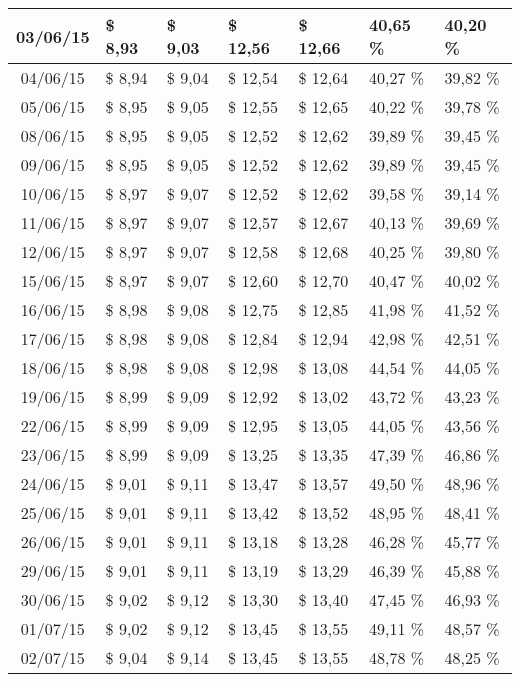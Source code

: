 \begin{center}
\begin{longtable}{|c|p{1.5cm}|p{1.5cm}|p{1.5cm}|p{1.5cm}|p{1.5cm}|p{1.5cm}|}
03/06/15 & \$ 8,93 & \$ 9,03 & \$ 12,56 & \$ 12,66 & 40,65 \% & 40,20 \% \\ \hline
04/06/15 & \$ 8,94 & \$ 9,04 & \$ 12,54 & \$ 12,64 & 40,27 \% & 39,82 \% \\ \hline
05/06/15 & \$ 8,95 & \$ 9,05 & \$ 12,55 & \$ 12,65 & 40,22 \% & 39,78 \% \\ \hline
08/06/15 & \$ 8,95 & \$ 9,05 & \$ 12,52 & \$ 12,62 & 39,89 \% & 39,45 \% \\ \hline
09/06/15 & \$ 8,95 & \$ 9,05 & \$ 12,52 & \$ 12,62 & 39,89 \% & 39,45 \% \\ \hline
10/06/15 & \$ 8,97 & \$ 9,07 & \$ 12,52 & \$ 12,62 & 39,58 \% & 39,14 \% \\ \hline
11/06/15 & \$ 8,97 & \$ 9,07 & \$ 12,57 & \$ 12,67 & 40,13 \% & 39,69 \% \\ \hline
12/06/15 & \$ 8,97 & \$ 9,07 & \$ 12,58 & \$ 12,68 & 40,25 \% & 39,80 \% \\ \hline
15/06/15 & \$ 8,97 & \$ 9,07 & \$ 12,60 & \$ 12,70 & 40,47 \% & 40,02 \% \\ \hline
16/06/15 & \$ 8,98 & \$ 9,08 & \$ 12,75 & \$ 12,85 & 41,98 \% & 41,52 \% \\ \hline
17/06/15 & \$ 8,98 & \$ 9,08 & \$ 12,84 & \$ 12,94 & 42,98 \% & 42,51 \% \\ \hline
18/06/15 & \$ 8,98 & \$ 9,08 & \$ 12,98 & \$ 13,08 & 44,54 \% & 44,05 \% \\ \hline
19/06/15 & \$ 8,99 & \$ 9,09 & \$ 12,92 & \$ 13,02 & 43,72 \% & 43,23 \% \\ \hline
22/06/15 & \$ 8,99 & \$ 9,09 & \$ 12,95 & \$ 13,05 & 44,05 \% & 43,56 \% \\ \hline
23/06/15 & \$ 8,99 & \$ 9,09 & \$ 13,25 & \$ 13,35 & 47,39 \% & 46,86 \% \\ \hline
24/06/15 & \$ 9,01 & \$ 9,11 & \$ 13,47 & \$ 13,57 & 49,50 \% & 48,96 \% \\ \hline
25/06/15 & \$ 9,01 & \$ 9,11 & \$ 13,42 & \$ 13,52 & 48,95 \% & 48,41 \% \\ \hline
26/06/15 & \$ 9,01 & \$ 9,11 & \$ 13,18 & \$ 13,28 & 46,28 \% & 45,77 \% \\ \hline
29/06/15 & \$ 9,01 & \$ 9,11 & \$ 13,19 & \$ 13,29 & 46,39 \% & 45,88 \% \\ \hline
30/06/15 & \$ 9,02 & \$ 9,12 & \$ 13,30 & \$ 13,40 & 47,45 \% & 46,93 \% \\ \hline
01/07/15 & \$ 9,02 & \$ 9,12 & \$ 13,45 & \$ 13,55 & 49,11 \% & 48,57 \% \\ \hline
02/07/15 & \$ 9,04 & \$ 9,14 & \$ 13,45 & \$ 13,55 & 48,78 \% & 48,25 \% \\ \hline

\end{longtable}
\end{center}

